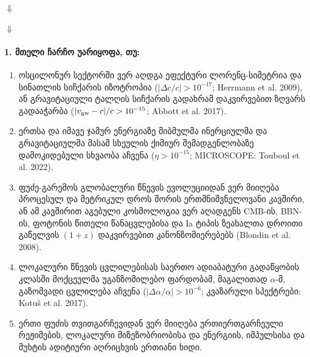 \documentclass[11pt,a4paper]{article}
\begin{document}
\begin{center}

\vspace{0.35em}
$\Downarrow$
\vspace{0.35em}


\vspace{0.35em}
$\Downarrow$
\vspace{0.35em}

\end{center}

\paragraph{1. მთელი ჩარჩო უარიყოფა, თუ:}

\begin{enumerate}[label=\arabic*.]
\item ოსცილონურ სექტორში ვერ აღდგა ეფექტური ლორენც-სიმეტრია და სინათლის სიჩქარის იზოტროპია ($|\Delta c/c|>10^{-17}$; Herrmann et al. 2009), ან გრავიტაციული ტალღის სიჩქარის გადახრამ დაკვირვებით ზღვარს გადააჭარბა ($|v_{\rm gw}-c|/c>10^{-15}$; Abbott et al. 2017).
\item ერთსა და იმავე ჯამურ ენერგიაზე მიბმულმა ინერციულმა და გრავიტაციულმა მასამ სხეულის ქიმიურ შემადგენლობაზე დამოკიდებული სხვაობა აჩვენა ($\eta>10^{-15}$; MICROSCOPE: Touboul et al. 2022).
\item ფუძე-გარემოს გლობალური წნევის ევოლუციიდან ვერ მიიღება პროცესულ და მეტრიკულ დროს შორის ერთმნიშვნელოვანი კავშირი, ან ამ კავშირით აგებული კოსმოლოგია ვერ აღადგენს CMB-ის, BBN-ის, ფოტონის წითელი წანაცვლებისა და Ia ტიპის ზეახალთა დროითი გაწელვის $(1+z)$ დაკვირვებით კანონზომიერებებს (Blondin et al. 2008).
\item ლოკალური წნევის ცვლილებისას საერთო ადიაბატური გადაწყობის კლასში მოქცეულმა უგანზომილებო ფარდობამ, მაგალითად $\alpha$-მ, გაზომვადი ცვლილება აჩვენა ($|\Delta\alpha/\alpha|>10^{-6}$; კვაზარული სპექტრები: Kotuš et al. 2017).
\item ერთი ფუძის თვითგარჩევიდან ვერ მიიღება ურთიერთგარჩეული რეჟიმების, ლოკალური მიზეზობრიობისა და ენერგიის, იმპულსისა და მუხტის ადიტიური აღრიცხვის ერთიანი ხიდი.

\end{enumerate}
\end{document}
